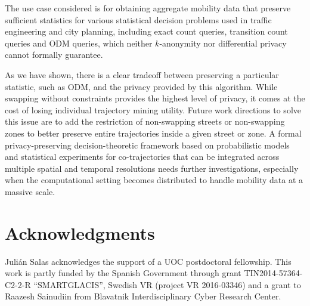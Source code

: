 \documentclass{llncs}
\begin{document}
The use case considered is for obtaining aggregate mobility data that preserve sufficient statistics for various statistical decision problems used in traffic engineering and city planning, including exact count queries, transition count queries and ODM queries, which neither $k$-anonymity nor differential privacy cannot formally guarantee.

As we have shown, there is a clear tradeoff between preserving a particular statistic, such as ODM, and the privacy provided by this algorithm.
While swapping without constraints provides the highest level of privacy, it comes at the cost of losing individual trajectory mining utility.
Future work directions to solve this issue are to add the restriction of non-swapping streets or non-swapping zones to better preserve entire trajectories inside a given street or zone.  
A formal privacy-preserving decision-theoretic framework based on probabilistic models and statistical experiments for co-trajectories that can be integrated across multiple spatial and temporal resolutions needs further investigations, especially when the computational setting becomes distributed to handle mobility data at a massive scale.

\section*{Acknowledgments}
Juli\'{a}n Salas acknowledges the support of a UOC postdoctoral fellowship.
This work is partly funded by the Spanish Government through grant TIN2014-57364-C2-2-R ``SMARTGLACIS'', Swedish VR (project VR 2016-03346) and a grant to Raazesh Sainudiin from Blavatnik Interdisciplinary Cyber Research Center.



\end{document}
